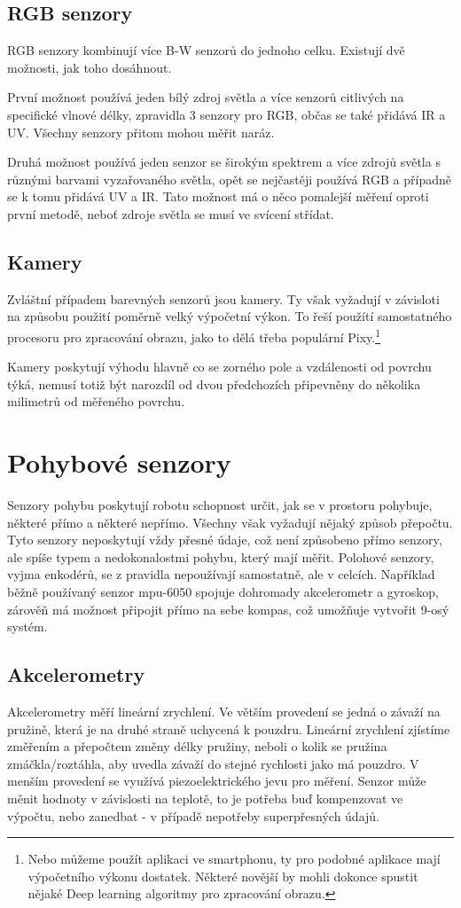 \subsection{RGB senzory}
RGB senzory kombinují více B-W senzorů do jednoho celku.
Existují dvě možnosti, jak toho dosáhnout. 

První možnost používá jeden bílý zdroj světla a více senzorů citlivých na specifické vlnové délky, zpravidla 3 senzory pro RGB, občas se také přidává IR a UV.
Všechny senzory přitom mohou měřit naráz.

Druhá možnost používá jeden senzor se širokým spektrem a více zdrojů světla s různými barvami vyzařovaného světla, opět se nejčastěji používá RGB a případně se k tomu přidává UV a IR.
Tato možnost má o něco pomalejší měření oproti první metodě, neboť zdroje světla se musí ve svícení střídat.

\subsection{Kamery}
Zvláštní případem barevných senzorů jsou kamery.
Ty však vyžadují v závisloti na způsobu použití poměrně velký výpočetní výkon.
To řeší použítí samostatného procesoru pro zpracování obrazu, jako to dělá třeba populární Pixy.\footnote{Nebo můžeme použít aplikaci ve smartphonu, ty pro podobné aplikace mají výpočetního výkonu dostatek. Některé novější by mohli dokonce spustit nějaké Deep learning algoritmy pro zpracování obrazu.}

Kamery poskytují výhodu hlavně co se zorného pole a vzdálenosti od povrchu týká, nemusí totiž být narozdíl od dvou předchozích připevněny do několika milimetrů od měřeného povrchu.

\section{Pohybové senzory} 
Senzory pohybu poskytují robotu schopnost určit, jak se v prostoru pohybuje, některé přímo a některé nepřímo.
Všechny však vyžadují nějaký způsob přepočtu.
Tyto senzory neposkytují vždy přesné údaje, což není způsobeno přímo senzory, ale spíše typem a nedokonalostmi pohybu, který mají měřit.
Polohové senzory, vyjma enkodérů, se z pravidla nepoužívají samostatně, ale v celcích.
Například běžně používaný senzor mpu-6050 spojuje dohromady akcelerometr a gyroskop, zárověň má možnost připojit přímo na sebe kompas, což umožňuje vytvořit 9-osý systém.


\subsection{Akcelerometry}
Akcelerometry měří lineární zrychlení. Ve větším provedení se jedná o závaží na pružině, která je na druhé straně uchycená k pouzdru. 
Lineární zrychlení zjístíme změřením a přepočtem změny délky pružiny, neboli o kolik se pružina zmáčkla/roztáhla, aby uvedla závaží do stejné rychlosti jako má pouzdro.
V menším provedení se využívá piezoelektrického jevu pro měření.
Senzor může měnit hodnoty v závislosti na teplotě, to je potřeba buď kompenzovat ve výpočtu, nebo zanedbat - v případě nepotřeby superpřesných údajů. 
\cite{accel}

